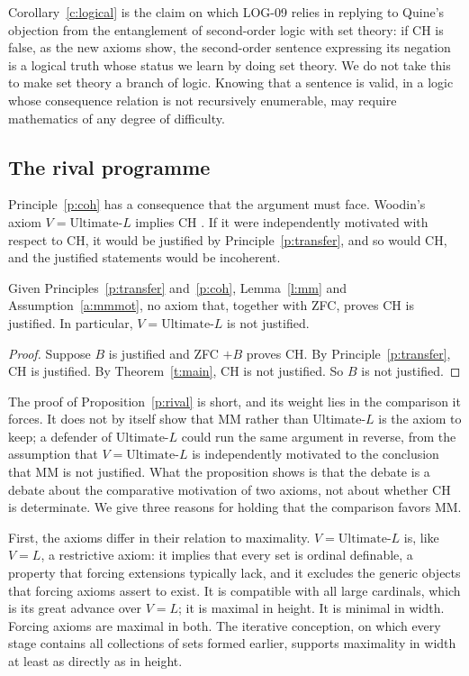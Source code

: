 \documentclass{situationist-preprint}
\begin{document}
Corollary~\ref{c:logical} is the claim on which LOG-09 relies in replying to Quine's objection from the entanglement of second-order logic with set theory: if CH is false, as the new axioms show, the second-order sentence expressing its negation is a logical truth whose status we learn by doing set theory. We do not take this to make set theory a branch of logic. Knowing that a sentence is valid, in a logic whose consequence relation is not recursively enumerable, may require mathematics of any degree of difficulty.

\subsection{The rival programme}\label{s:ultimate}

Principle~\ref{p:coh} has a consequence that the argument must face. Woodin's axiom $V = \text{Ultimate-}L$ implies CH \citep{Woodin2017}. If it were independently motivated with respect to CH, it would be justified by Principle~\ref{p:transfer}, and so would CH, and the justified statements would be incoherent.

\begin{proposition}\label{p:rival}
Given Principles~\ref{p:transfer} and~\ref{p:coh}, Lemma~\ref{l:mm} and Assumption~\ref{a:mmmot}, no axiom that, together with ZFC, proves CH is justified. In particular, $V = \text{Ultimate-}L$ is not justified.
\end{proposition}

\begin{proof}
Suppose $B$ is justified and ZFC $+ B$ proves CH. By Principle~\ref{p:transfer}, CH is justified. By Theorem~\ref{t:main}, CH is not justified. So $B$ is not justified.
\end{proof}

The proof of Proposition~\ref{p:rival} is short, and its weight lies in the comparison it forces. It does not by itself show that MM rather than Ultimate-$L$ is the axiom to keep; a defender of Ultimate-$L$ could run the same argument in reverse, from the assumption that $V = \text{Ultimate-}L$ is independently motivated to the conclusion that MM is not justified. What the proposition shows is that the debate is a debate about the comparative motivation of two axioms, not about whether CH is determinate. We give three reasons for holding that the comparison favors MM.

First, the axioms differ in their relation to maximality. $V = \text{Ultimate-}L$ is, like $V = L$, a restrictive axiom: it implies that every set is ordinal definable, a property that forcing extensions typically lack, and it excludes the generic objects that forcing axioms assert to exist. It is compatible with all large cardinals, which is its great advance over $V = L$; it is maximal in height. It is minimal in width. Forcing axioms are maximal in both. The iterative conception, on which every stage contains all collections of sets formed earlier, supports maximality in width at least as directly as in height.
\end{document}
